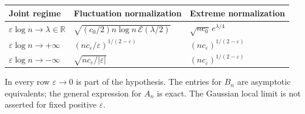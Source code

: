 \documentclass[11pt,a4paper]{article}
\numberwithin{equation}{section}
\theoremstyle{definition}
\theoremstyle{remark}
\newcommand{\R}{\mathbb R}
\newcommand{\eps}{\varepsilon}
\newcommand{\cE}{\mathcal E}
\begin{document}
\begin{center}
\small
\begin{tabular}{@{}lll@{}}
\toprule
Joint regime & Fluctuation normalization & Extreme normalization\\
\midrule
\(\eps\log n\to\lambda\in\R\) &
\(\sqrt{(c_0/2)n\log n\,\cE(\lambda/2)}\) &
\(\sqrt{nc_0}\,e^{\lambda/4}\)\\[5pt]
\(\eps\log n\to+\infty\) &
\((nc_\eps/\eps)^{1/(2-\eps)}\) &
\((nc_\eps)^{1/(2-\eps)}\)\\[5pt]
\(\eps\log n\to-\infty\) &
\(\sqrt{nc_\eps/|\eps|}\) &
\((nc_\eps)^{1/(2-\eps)}\)\\
\bottomrule
\end{tabular}
\end{center}
In every row \(\eps\to0\) is part of the hypothesis. The entries for \(B_n\)
are asymptotic equivalents; the general expression for \(A_n\) is exact.
The Gaussian local limit is not asserted for fixed positive \(\eps\).
\end{document}
